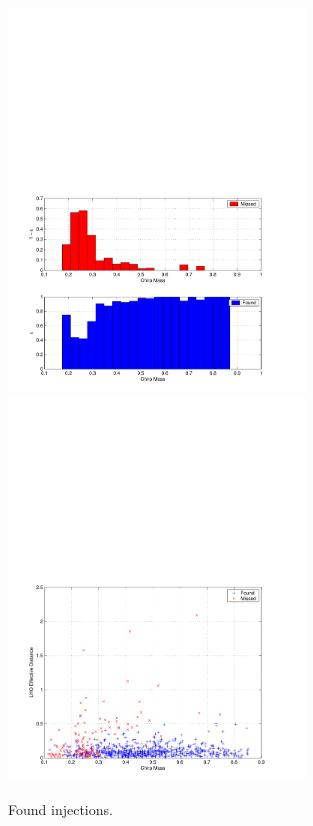\begin{figure}[p]
\begin{center}
\includegraphics[width=0.7\textwidth]{figures/result/mchirp_eff} \\
\includegraphics[width=0.7\textwidth]{figures/result/mchirp_found_missed}
\end{center}
\caption{\label{f:mchirp_eff}%
Found injections.
}
\end{figure}

